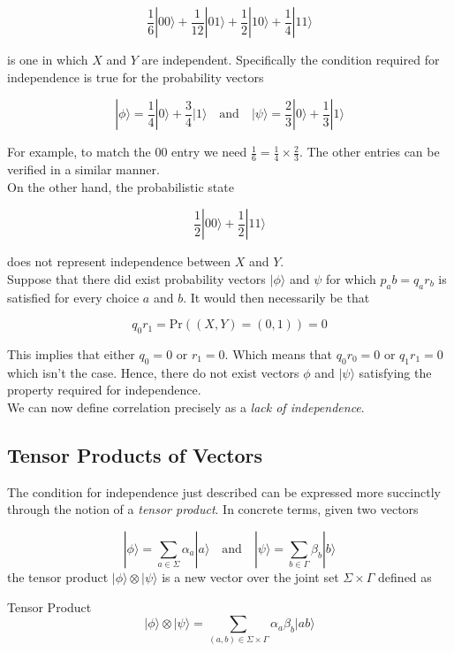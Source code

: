 \documentclass[svgnames]{article}     %
\begin{document}
\[
\frac{1}{6}|00\rangle + \frac{1}{12}|01\rangle + \frac{1}{2}|10\rangle
+ \frac{1}{4}|11\rangle
\] \vspace{5px}

is one in which $X$ and $Y$ are independent. Specifically the condition
required for independence is true for the probability vectors 

\[
|\phi\rangle = \frac{1}{4}|0\rangle + \frac{3}{4}|1\rangle \quad \text{and}
\quad |\psi\rangle = \frac{2}{3}|0\rangle + \frac{1}{3}|1\rangle
\] \vspace{5px}

For example, to match the 00 entry we need $\frac{1}{6} = \frac{1}{4} \times
\frac{2}{3}$. The other entries can be verified in a similar manner.\\

On the other hand, the probabilistic state 

\[
\frac{1}{2}|00\rangle + \frac{1}{2}|11\rangle
\] \vspace{5px}

does not represent independence between $X$ and $Y$. \\

Suppose that there did exist probability vectors $|\phi\rangle$ and $\psi$ for
which $p_ab = q_ar_b$ is satisfied for every choice $a$ and $b$. It would then
necessarily be that 

\[
q_0r_1 = \text{Pr} ((X,Y) = (0, 1)) = 0
\] \vspace{5px}

This implies that either $q_0 = 0$ or $r_1 = 0$. Which means that $q_0r_0 = 0$
or $q_1r_1 = 0$ which isn't the case. Hence, there do not exist vectors $\phi$
and $|\psi\rangle$ satisfying the property required for independence. \\

We can now define correlation precisely as a \textit{lack of independence}. 

\subsection{Tensor Products of Vectors}

The condition for independence just described can be expressed more succinctly
through the notion of a \textit{tensor product}. In concrete terms, given two
vectors 

\[
  |\phi\rangle = \sum_{a\in\Sigma} \alpha_a |a\rangle \quad \text{and} \quad  |\psi\rangle = \sum_{b\in\Gamma} \beta_b |b\rangle
\] \vspace{5px}
the tensor product $|\phi\rangle \otimes |\psi\rangle $ is a new vector over
the joint set $\Sigma \times \Gamma$ defined as 
\begin{subbox}{Tensor Product}
\[
  |\phi\rangle \otimes |\psi\rangle = \sum_{(a,b) \in \Sigma \times \Gamma}
  \alpha_a \beta_b |ab\rangle 
\] 
\end{subbox}
\end{document}
